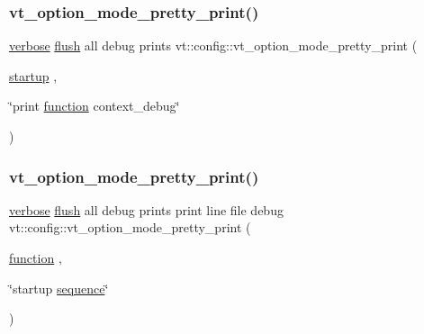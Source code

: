 \mbox{\label{namespacevt_1_1config_a8019230f6479fd998e4fd0f33a26a1a6}} 
\subsubsection{\texorpdfstring{vt\+\_\+option\+\_\+mode\+\_\+pretty\+\_\+print()}{vt\_option\_mode\_pretty\_print()}\hspace{0.1cm}{\footnotesize\ttfamily [3/4]}}
{\footnotesize\ttfamily \hyperlink{namespacevt_1_1config_a724e99568632cc0fe9c456c2230270d0a9b54bf70f7b7fe7cfb6f3da0e167ae27}{verbose} \hyperlink{namespacevt_1_1config_a724e99568632cc0fe9c456c2230270d0a5c484f36b0f33ded7e640cc30fe5e725}{flush} all debug prints vt\+::config\+::vt\+\_\+option\+\_\+mode\+\_\+pretty\+\_\+print (\begin{DoxyParamCaption}\item[{\hyperlink{namespacevt_1_1config_a724e99568632cc0fe9c456c2230270d0ad6e94cfdf66c00de0a906cec0f346d6b}{startup}}]{,  }\item[{\char`\"{}print \hyperlink{namespacevt_1_1config_a724e99568632cc0fe9c456c2230270d0a479a398ca7c07756b7f07ee19cb9b183}{function} context\+\_\+debug\char`\"{}}]{ }\end{DoxyParamCaption})}

\mbox{\label{namespacevt_1_1config_a287e502bd7dbdc1f80e3cadf4993d9ea}} 
\subsubsection{\texorpdfstring{vt\+\_\+option\+\_\+mode\+\_\+pretty\+\_\+print()}{vt\_option\_mode\_pretty\_print()}\hspace{0.1cm}{\footnotesize\ttfamily [4/4]}}
{\footnotesize\ttfamily \hyperlink{namespacevt_1_1config_a724e99568632cc0fe9c456c2230270d0a9b54bf70f7b7fe7cfb6f3da0e167ae27}{verbose} \hyperlink{namespacevt_1_1config_a724e99568632cc0fe9c456c2230270d0a5c484f36b0f33ded7e640cc30fe5e725}{flush} all debug prints print line file debug vt\+::config\+::vt\+\_\+option\+\_\+mode\+\_\+pretty\+\_\+print (\begin{DoxyParamCaption}\item[{\hyperlink{namespacevt_1_1config_a724e99568632cc0fe9c456c2230270d0a479a398ca7c07756b7f07ee19cb9b183}{function}}]{,  }\item[{\char`\"{}startup \hyperlink{namespacevt_1_1config_a6bd1d6215bda0d8ca02811798399f689aa8d88819a9eaa5f03b8432110059234c}{sequence}\char`\"{}}]{ }\end{DoxyParamCaption})}



